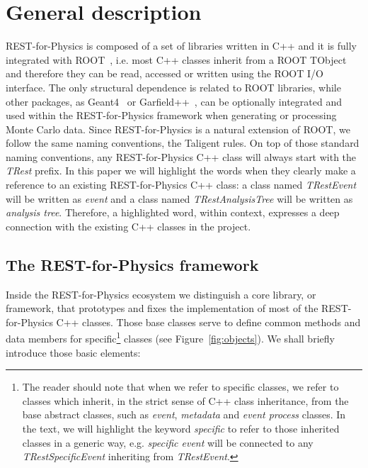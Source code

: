 \section{General description}
\label{sec:framework}

REST-for-Physics is composed of a set of libraries written in C++ and it is fully integrated with ROOT~\cite{ROOT,Brun:2011Gp,ROOT2011}, i.e. most C++ classes inherit from a ROOT TObject and therefore they can be read, accessed or written using the ROOT I/O interface. The only structural dependence is related to ROOT libraries, while other packages, as Geant4~\cite{Agostinelli:2002hh} or Garfield++~\cite{Garfield}, can be optionally integrated and used within the REST-for-Physics framework when generating or processing Monte Carlo data. Since REST-for-Physics is a natural extension of ROOT, we follow the same naming conventions, the Taligent rules. On top of those standard naming conventions, any REST-for-Physics C++ class will always start with the \emph{TRest} prefix. In this paper we will highlight the words when they clearly make a reference to an existing REST-for-Physics C++ class: a class named \emph{TRestEvent} will be written as \emph{event} and a class named \emph{TRestAnalysisTree} will be written as \emph{analysis tree}. Therefore, a highlighted word, within context, expresses a deep connection with the existing C++ classes in the project.

\subsection{The REST-for-Physics framework}
Inside the REST-for-Physics ecosystem we distinguish a core library, or framework, that prototypes and fixes the implementation of most of the REST-for-Physics C++ classes. Those base classes serve to define common methods and data members for specific\footnote{The reader should note that when we refer to specific classes, we refer to classes which inherit, in the strict sense of C++ class inheritance, from the base abstract classes, such as \emph{event}, \emph{metadata} and \emph{event process} classes. In the text, we will highlight the keyword \emph{specific} to refer to those inherited classes in a generic way, e.g. \emph{specific event} will be connected to any \emph{TRestSpecificEvent} inheriting from \emph{TRestEvent}. }
classes (see Figure~\ref{fig:objects}). We shall briefly introduce those basic elements:

